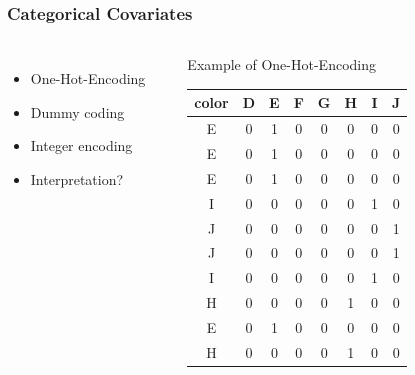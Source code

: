 \documentclass[
    utf8,
    aspectratio=169
]{beamer}  %
\begin{document}
\begin{frame}
	\frametitle{Categorical Covariates}
	\begin{columns}[onlytextwidth]
		\begin{itemize}
			\item One-Hot-Encoding
			\item Dummy coding
			\item Integer encoding
			\item Interpretation?
		\end{itemize}
	
		\vspace{1cm}
	
		\begin{example}
		\end{example}
	
		\begin{block}{\centering Example of One-Hot-Encoding}
			\begin{small}
				\begin{table}
					\begin{tabular}{c|ccccccc}
						   color& D& E& F &G&H &I &J \\
				  		\hline
						E  &   0  &   1  &   0  &   0  &   0  &   0  &   0 \\
						E  &   0  &   1  &   0  &   0  &   0  &   0  &   0 \\
						E  &   0  &   1  &   0  &   0  &   0  &   0  &   0 \\
						I  &   0  &   0  &   0  &   0  &   0  &   1  &   0 \\
						J  &   0  &   0  &   0  &   0  &   0  &   0  &   1 \\
						J  &   0  &   0  &   0  &   0  &   0  &   0  &   1 \\
						I  &   0  &   0  &   0  &   0  &   0  &   1  &   0 \\
						H  &   0  &   0  &   0  &   0  &   1  &   0  &   0 \\
						E  &   0  &   1  &   0  &   0  &   0  &   0  &   0 \\
						H  &   0  &   0  &   0  &   0  &   1  &   0  &   0 \\
				     	\hline
					\end{tabular}
				\end{table}
			\end{small}
		\end{block}
	\end{columns}
\end{frame}
\end{document}
